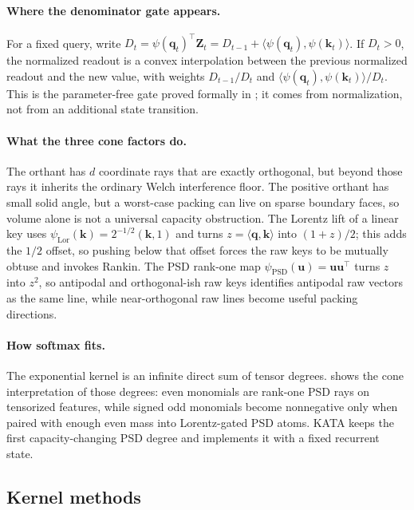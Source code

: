 \documentclass{article}
\newcommand{\1}{\bm{1}}
\newcommand{\lrangle}[1]{\langle#1\rangle}
\def\vk{{\bm{k}}}
\def\vq{{\bm{q}}}
\def\vu{{\bm{u}}}
\def\mZ{{\bm{Z}}}
\theoremstyle{definition}
\begin{document}
\paragraph{Where the denominator gate appears.}
For a fixed query, write $D_t=\psi(\vq_t)^\top\mZ_t=D_{t-1}+\lrangle{\psi(\vq_t),\psi(\vk_t)}$. If
$D_t>0$, the normalized readout is a convex interpolation between the previous normalized readout
and the new value, with weights $D_{t-1}/D_t$ and $\lrangle{\psi(\vq_t),\psi(\vk_t)}/D_t$. This is
the parameter-free gate proved formally in ; it comes from normalization,
not from an additional state transition.

\paragraph{What the three cone factors do.}
The orthant has $d$ coordinate rays that are exactly orthogonal, but beyond those rays it inherits
the ordinary Welch interference floor. The positive orthant has small solid angle, but a worst-case
packing can live on sparse boundary faces, so volume alone is not a universal capacity obstruction.
The Lorentz lift of a linear key uses $\psi_\mathrm{Lor}(\vk)=2^{-1/2}(\vk,1)$ and turns
$z=\lrangle{\vq,\vk}$ into $(1+z)/2$; this adds the $1/2$ offset, so pushing below that offset
forces the raw keys to be mutually obtuse and invokes Rankin. The PSD rank-one map
$\psi_\mathrm{PSD}(\vu)=\vu\vu^\top$ turns $z$ into $z^2$, so antipodal and orthogonal-ish raw keys
identifies antipodal raw vectors as the same line, while near-orthogonal raw lines become useful packing directions.



\paragraph{How softmax fits.}
The exponential kernel is an infinite direct sum of tensor degrees. 
shows the cone interpretation of those degrees: even monomials are rank-one PSD rays on tensorized
features, while signed odd monomials become nonnegative only when paired with enough even mass into
Lorentz-gated PSD atoms. KATA keeps the first capacity-changing PSD degree and implements it with a
fixed recurrent state.


\subsection{Kernel methods}
\label{app:kernel_methods}
\end{document}

